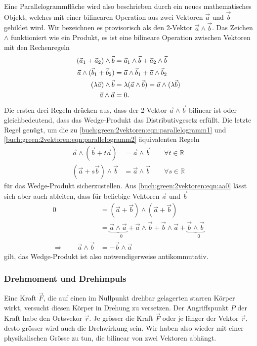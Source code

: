 Eine Parallelogrammfläche wird also beschrieben durch ein neues
mathematisches Objekt, welches mit einer bilinearen Operation aus
zwei Vektoren $\vec{a}$ und $\vec{b}$ gebildet wird.
Wir bezeichnen es provisorisch als den 2-Vektor $\vec{a}\wedge\vec{b}$.
Das Zeichen $\wedge$ funktioniert wie ein Produkt, es ist eine 
bilineare Operation zwischen Vektoren mit den Rechenregeln
\begin{align}
(\vec{a}_1+\vec{a}_2)\wedge\vec{b}
&=
\vec{a}_1\wedge\vec{b}+\vec{a}_2\wedge\vec{b}
\notag
\\
\vec{a}\wedge(\vec{b}_1+\vec{b}_2)
&=
\vec{a}\wedge\vec{b}_1 + \vec{a}\wedge\vec{b}_2
\notag
\\
(\lambda\vec{a})\wedge\vec{b}
&=
\lambda(\vec{a}\wedge\vec{b})=\vec{a}\wedge(\lambda\vec{b})
\notag
\\
\vec{a}\wedge\vec{a}&=0.
\label{buch:green:2vektoren:eqn:aa0}
\end{align}
Die ersten drei Regeln drücken aus, dass der 2-Vektor $\vec{a}\wedge\vec{b}$
bilinear ist oder gleichbedeutend, dass das Wedge-Produkt das
Distributivgesetz erfüllt.
Die letzte Regel genügt, um die zu
\eqref{buch:green:2vektoren:eqn:parallelogramm1}
und
\eqref{buch:green:2vektoren:eqn:parallelogramm2}
äquivalenten Regeln
\begin{equation}
\begin{aligned}
\vec{a}\wedge(\vec{b}+t\vec{a})
&=
\vec{a}\wedge\vec{b}
\qquad \forall t\in\mathbb{R}
\\
(\vec{a}+s\vec{b})\wedge\vec{b}
&=
\vec{a}\wedge\vec{b}
\qquad \forall s\in\mathbb{R}
\end{aligned}
\label{buch:green:2vektoren:eqn:grundeigenschaft}
\end{equation}
für das Wedge-Produkt sicherzustellen.
Aus \eqref{buch:green:2vektoren:eqn:aa0} lässt sich aber auch
ableiten, dass für beliebige Vektoren $\vec{a}$ und $\vec{b}$
\begin{align*}
0
&=
(\vec{a}+\vec{b})\wedge(\vec{a}+\vec{b})
\\
&=
\underbrace{\vec{a}\wedge\vec{a}}_{\displaystyle=0}
+
\vec{a}\wedge\vec{b}
+
\vec{b}\wedge\vec{a}
+
\underbrace{\vec{b}\wedge\vec{b}}_{\displaystyle=0}
\\
\Rightarrow\qquad
\vec{a}\wedge\vec{b}
&=
-\vec{b}\wedge\vec{a}
\end{align*}
gilt, das Wedge-Produkt ist also notwendigerweise antikommutativ.

%
%
\subsubsection{Drehmoment und Drehimpuls}
Eine Kraft $\vec{F}$, die auf einen im Nullpunkt drehbar gelagerten
starren Körper wirkt, versucht diesen Körper in Drehung zu versetzen.
Der Angriffspunkt $P$ der Kraft habe den Ortsvekor $\vec{r}$.
Je grösser die Kraft $\vec{F}$ oder je länger der Vektor $\vec{r}$,
desto grösser wird auch die Drehwirkung sein.
Wir haben also wieder mit einer physikalischen Grösse zu tun, die
bilinear von zwei Vektoren abhängt.

